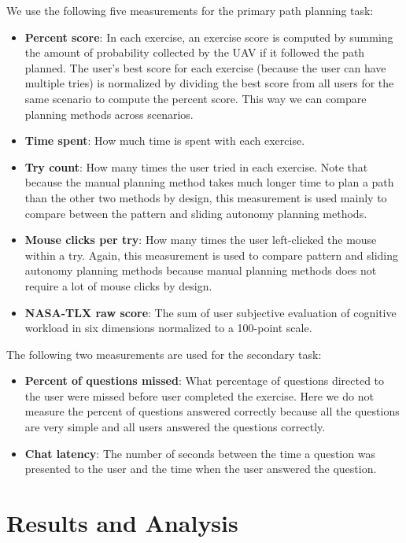 \documentclass[lettersize, apacite, twoside, HRI]{apa_HRI}
\begin{document}
We use the following five measurements for the primary path planning task:

\begin{itemize}
\item \textbf{Percent score}: In each exercise, an exercise score is computed by summing the amount of probability collected by the UAV if it followed the path planned. The user's best score for each exercise (because the user can have multiple tries) is normalized by dividing the best score from all users for the same scenario to compute the percent score. This way we can compare planning methods across scenarios.
\item \textbf{Time spent}: How much time is spent with each exercise.
\item \textbf{Try count}: How many times the user tried in each exercise. Note that because the manual planning method takes much longer time to plan a path than the other two methods by design, this measurement is used mainly to compare between the pattern and sliding autonomy planning methods.
\item \textbf{Mouse clicks per try}: How many times the user left-clicked the mouse within a try. Again, this measurement is used to compare pattern and sliding autonomy planning methods because manual planning methods does not require a lot of mouse clicks by design.
\item \textbf{NASA-TLX raw score}: The sum of user subjective evaluation of cognitive workload in six dimensions normalized to a 100-point scale. 
\end{itemize}

The following two measurements are used for the secondary task:
\begin{itemize}
\item \textbf{Percent of questions missed}: What percentage of questions directed to the user were missed before user completed the exercise. Here we do not measure the percent of questions answered correctly because all the questions are very simple and all users answered the questions correctly.
\item \textbf{Chat latency}: The number of seconds between the time a question was presented to the user and the time when the user answered the question.
\end{itemize}

\section{Results and Analysis} 
\label{sec:Results}
\end{document}
